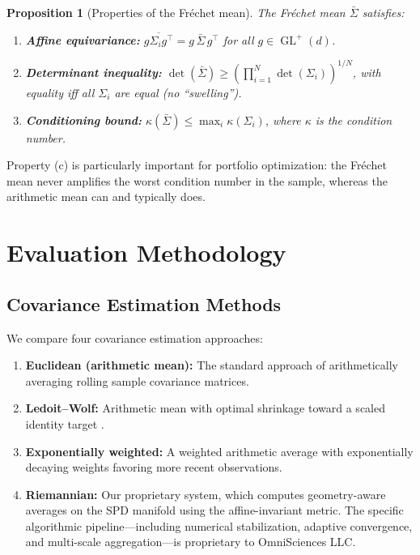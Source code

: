 \documentclass[12pt,a4paper]{article}
\newtheorem{proposition}[theorem]{Proposition}
\DeclareMathOperator{\GL}{GL}
\begin{document}
\begin{proposition}[Properties of the Fr\'{e}chet mean]
The Fr\'{e}chet mean $\bar{\Sigma}$ satisfies:
\begin{enumerate}[label=(\alph*)]
    \item \textbf{Affine equivariance:} $\overline{g \Sigma_i g^\top}
    = g\,\bar{\Sigma}\,g^\top$ for all $g \in \GL^+(d)$.
    \item \textbf{Determinant inequality:} $\det(\bar{\Sigma}) \geq
    \left(\prod_{i=1}^N \det(\Sigma_i)\right)^{1/N}$, with equality iff
    all $\Sigma_i$ are equal (no ``swelling'').
    \item \textbf{Conditioning bound:} $\kappa(\bar{\Sigma}) \leq
    \max_i \kappa(\Sigma_i)$, where $\kappa$ is the condition number.
\end{enumerate}
\end{proposition}

Property (c) is particularly important for portfolio optimization:
the Fr\'{e}chet mean never amplifies the worst condition number in the sample,
whereas the arithmetic mean can and typically does.


\section{Evaluation Methodology}\label{sec:methodology}

\subsection{Covariance Estimation Methods}

We compare four covariance estimation approaches:

\begin{enumerate}[label=(\roman*)]
    \item \textbf{Euclidean (arithmetic mean):} The standard approach of
    arithmetically averaging rolling sample covariance matrices.

    \item \textbf{Ledoit--Wolf:} Arithmetic mean with optimal shrinkage
    toward a scaled identity target \citep{LedoitWolf2004}.

    \item \textbf{Exponentially weighted:} A weighted arithmetic average
    with exponentially decaying weights favoring more recent observations.

    \item \textbf{Riemannian:} Our proprietary system, which computes
    geometry-aware averages on the SPD manifold using the affine-invariant
    metric. The specific algorithmic pipeline---including numerical
    stabilization, adaptive convergence, and multi-scale aggregation---is
    proprietary to OmniSciences LLC.
\end{enumerate}
\end{document}
